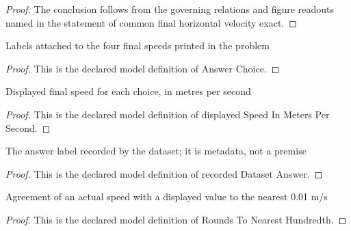\begin{proof}
  The conclusion follows from the governing relations and figure readouts named in the statement of common final horizontal velocity exact.
\end{proof}
\begin{definition}
  \label{def:physics:phyx-mini-0768:phyxminiproblems-problemphyxmini0768-answerchoice}
  Labels attached to the four final speeds printed in the problem
\end{definition}
\begin{proof}
  This is the declared model definition of Answer Choice.
\end{proof}
\begin{definition}
  \label{def:physics:phyx-mini-0768:phyxminiproblems-problemphyxmini0768-displayedspeedinmeterspersecond}
  Displayed final speed for each choice, in metres per second
\end{definition}
\begin{proof}
  This is the declared model definition of displayed Speed In Meters Per Second.
\end{proof}
\begin{definition}
  \label{def:physics:phyx-mini-0768:phyxminiproblems-problemphyxmini0768-recordeddatasetanswer}
  The answer label recorded by the dataset; it is metadata, not a premise
\end{definition}
\begin{proof}
  This is the declared model definition of recorded Dataset Answer.
\end{proof}
\begin{definition}
  \label{def:physics:phyx-mini-0768:phyxminiproblems-problemphyxmini0768-roundstonearesthundredth}
  Agreement of an actual speed with a displayed value to the nearest 0.01 m/s
\end{definition}
\begin{proof}
  This is the declared model definition of Rounds To Nearest Hundredth.
\end{proof}
